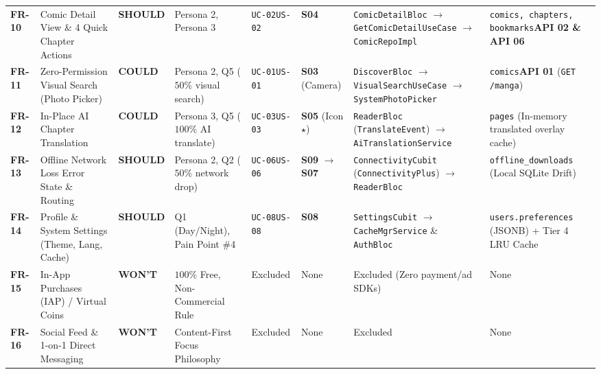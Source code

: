 \begin{scriptsize}
\begin{longtable}{C{1.1cm} L{2.4cm} C{1.45cm} L{1.7cm} C{1.2cm} C{1.2cm} L{3.3cm} L{2.75cm}}
\mbox{\textbf{FR-10}} & Comic Detail View \& 4 Quick Chapter Actions & \textbf{SHOULD} & Persona 2, Persona 3 & \texttt{UC-02}\newline \texttt{US-02} & \textbf{S04} & \texttt{ComicDetailBloc} $\to$ \allowbreak\texttt{Get\allowbreak Comic\allowbreak Detail\allowbreak UseCase} $\to$ \allowbreak\texttt{ComicRepoImpl} & \texttt{comics, chapters, bookmarks}\newline \textbf{API 02 \& API 06} \\
\mbox{\textbf{FR-11}} & Zero-Permission Visual Search (Photo Picker) & \textbf{COULD} & Persona 2, Q5 ($50\%$ visual search) & \texttt{UC-01}\newline \texttt{US-01} & \textbf{S03} (Camera) & \texttt{DiscoverBloc} $\to$ \allowbreak\texttt{Visual\allowbreak Search\allowbreak UseCase} $\to$ \allowbreak\texttt{SystemPhotoPicker} & \texttt{comics}\newline \textbf{API 01} (\texttt{GET /manga}) \\
\mbox{\textbf{FR-12}} & In-Place AI Chapter Translation & \textbf{COULD} & Persona 3, Q5 ($100\%$ AI translate) & \texttt{UC-03}\newline \texttt{US-03} & \textbf{S05} (Icon $\star$) & \texttt{ReaderBloc} (\texttt{TranslateEvent}) $\to$ \allowbreak\texttt{Ai\allowbreak Translation\allowbreak Service} & \texttt{pages} (In-memory translated overlay cache) \\
\mbox{\textbf{FR-13}} & Offline Network Loss Error State \& Routing & \textbf{SHOULD} & Persona 2, Q2 ($50\%$ network drop) & \texttt{UC-06}\newline \texttt{US-06} & \textbf{S09} $\to$ \textbf{S07} & \texttt{ConnectivityCubit} (\texttt{ConnectivityPlus}) $\to$ \allowbreak\texttt{ReaderBloc} & \texttt{offline\_\allowbreak downloads} (Local SQLite Drift) \\
\mbox{\textbf{FR-14}} & Profile \& System Settings (Theme, Lang, Cache) & \textbf{SHOULD} & Q1 (Day/Night), Pain Point \#4 & \texttt{UC-08}\newline \texttt{US-08} & \textbf{S08} & \texttt{SettingsCubit} $\to$ \allowbreak\texttt{CacheMgrService} \& \texttt{AuthBloc} & \texttt{users.preferences} (JSONB) + Tier 4 LRU Cache \\
\mbox{\textbf{FR-15}} & In-App Purchases (IAP) / Virtual Coins & \textbf{WON'T} & $100\%$ Free, Non-Commercial Rule & Excluded & None & Excluded (Zero payment/ad SDKs) & None \\
\mbox{\textbf{FR-16}} & Social Feed \& 1-on-1 Direct Messaging & \textbf{WON'T} & Content-First Focus Philosophy & Excluded & None & Excluded & None \\
\end{longtable}
\end{scriptsize}

